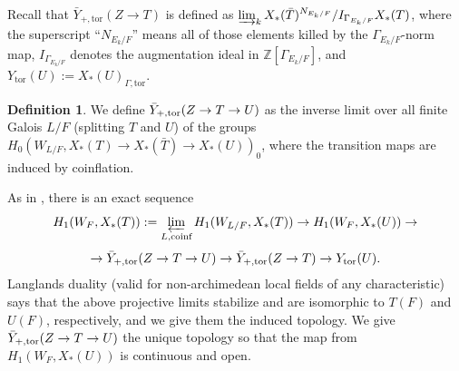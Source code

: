 \documentclass{amsart}
\theoremstyle{definition}
\newtheorem{definition}[result]{Definition}
\theoremstyle{remark}
\begin{document}
Recall that $\bar{Y}_{+,\text{tor}}(Z \to T)$ is defined as $\varinjlim_{k} X_{*}(\bar{T})^{N_{E_{k}/F}}/I_{\Gamma_{E_{k}/F}}X_{*}(T)$, where the superscript ``$N_{E_{k}/F}$'' means all of those elements killed by the $\Gamma_{E_{k}/F}$-norm map, $I_{\Gamma_{E_{k}/F}}$ denotes the augmentation ideal in $\mathbb{Z}[\Gamma_{E_{k}/F}]$, and $Y_{\text{tor}}(U):=X_{*}(U)_{\Gamma,\text{tor}}$.

\begin{definition}
    We define $\bar{Y}_{+,\textnormal{tor}}(Z \to T \to U)$ as the inverse limit over all finite Galois $L/F$ (splitting $T$ and $U$) of the groups $H_{0}(W_{L/F}, X_{*}(T) \to X_{*}(\bar{T}) \to X_{*}(U))_{0}$, where the transition maps are induced by coinflation.
\end{definition}

As in \cite[Fact 5.5]{Kal26b}, there is an exact sequence
\begin{equation}\label{eq:dualLES}
   H_{1}(W_{F},X_{*}(T)):= \varprojlim_{L, \text{coinf}}H_{1}(W_{L/F}, X_{*}(T)) \to H_{1}(W_{F}, X_{*}(U)) \to 
   \end{equation}
   \begin{equation*}
   \to \bar{Y}_{+,\textnormal{tor}}(Z \to T \to U) \to \bar{Y}_{+,\textnormal{tor}}(Z \to T) \to Y_{\textnormal{tor}}(U).
\end{equation*}
Langlands duality \cite{Borel77} (valid for non-archimedean local fields of any characteristic) says that the above projective limits stabilize and are isomorphic to $T(F)$ and $U(F)$, respectively, and we give them the induced topology. We give $\bar{Y}_{+,\textnormal{tor}}(Z \to T \to U)$ the unique topology so that the map from $H_{1}(W_{F}, X_{*}(U))$ is continuous and open.
\end{document}
